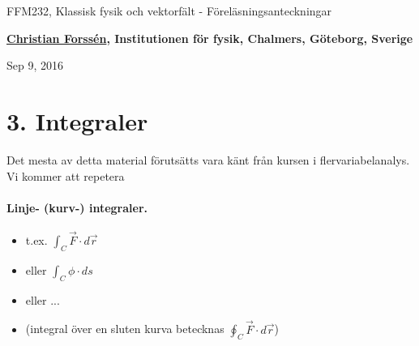 \documentclass[%
oneside,                 %
final,                   %
10pt]{article}
\begin{document}






\thispagestyle{empty}

\begin{center}
{\LARGE\bf
\begin{spacing}{1.25}
FFM232, Klassisk fysik och vektorfält - Föreläsningsanteckningar
\end{spacing}
}
\end{center}


\begin{center}
{\bf \href{{http://fy.chalmers.se/subatom/tsp/}}{Christian Forssén}, Institutionen för fysik, Chalmers, Göteborg, Sverige${}^{}$} \\ [0mm]
\end{center}

\begin{center}
\end{center}
    

\begin{center}
Sep 9, 2016
\end{center}

\vspace{1cm}


\section{3. Integraler}
Det mesta av detta material förutsätts vara känt från kursen i flervariabelanalys. Vi kommer att repetera
\paragraph{Linje- (kurv-) integraler.}
\begin{itemize}
\item t.ex. $\int_C \vec{F} \cdot d\vec{r}$

\item eller $\int_C \phi \cdot ds$

\item eller ...

\item (integral över en sluten kurva betecknas $\oint_C \vec{F} \cdot d\vec{r}$)
\end{itemize}
\end{document}
